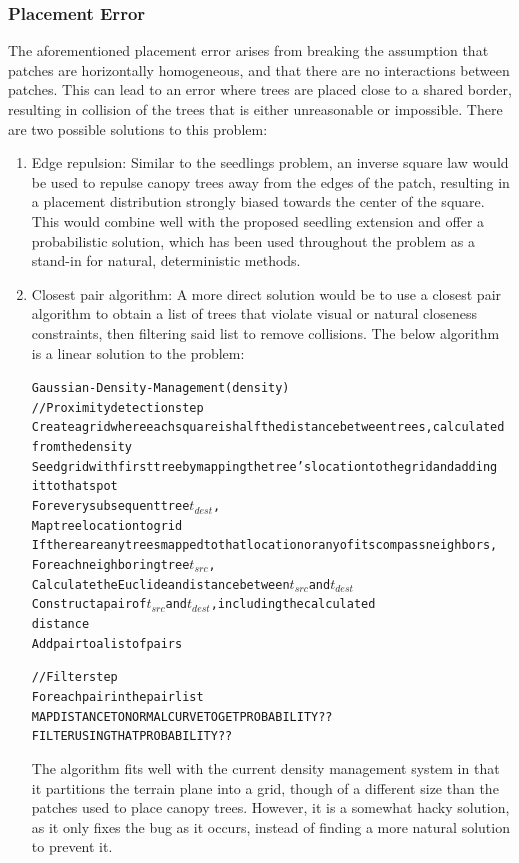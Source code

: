 \documentclass{article}
\newcommand{\tab}{\hspace*{2em}}
\begin{document}
            \subsubsection{Placement Error}
    \tab The aforementioned placement error arises from breaking the assumption that patches are
horizontally homogeneous, and that there are no interactions between patches. This can lead to an
error where trees are placed close to a shared border, resulting in collision of the trees that is
either unreasonable or impossible. There are two possible solutions to this problem:
\begin{enumerate}
    \item Edge repulsion: Similar to the seedlings problem, an inverse square law would be used to
repulse canopy trees away from the edges of the patch, resulting in a placement distribution
strongly biased towards the center of the square. This would combine well with the proposed
seedling extension and offer a probabilistic solution, which has been used throughout the problem
as a stand-in for natural, deterministic methods.

    \item Closest pair algorithm: A more direct solution would be to use a closest pair
algorithm\cite{kramii14} to obtain a list of trees that violate visual or natural closeness
constraints, then filtering said list to remove collisions. The below algorithm is a linear
solution to the problem:
\begin{alltt}
Gaussian-Density-Management(density)
    // Proximity detection step
    Create a grid where each square is half the distance between trees, calculated
        from the density
    Seed grid with first tree by mapping the tree's location to the grid and adding
        it to that spot
    For every subsequent tree \(t_{dest}\),
        Map tree location to grid
        If there are any trees mapped to that location or any of its compass neighbors,
            For each neighboring tree \(t_{src}\),
                Calculate the Euclidean distance between \(t_{src}\) and \(t_{dest}\)
                Construct a pair of \(t_{src}\) and \(t_{dest}\), including the calculated
                    distance
                Add pair to a list of pairs

    // Filter step
    For each pair in the pair list
        MAP DISTANCE TO NORMAL CURVE TO GET PROBABILITY??
        FILTER USING THAT PROBABILITY??
    \end{alltt}
    \tab The algorithm fits well with the current density management system in that it partitions
the terrain plane into a grid, though of a different size than the patches used to place canopy
trees. However, it is a somewhat hacky solution, as it only fixes the bug as it occurs, instead of
finding a more natural solution to prevent it.

\end{enumerate}
\end{document}
